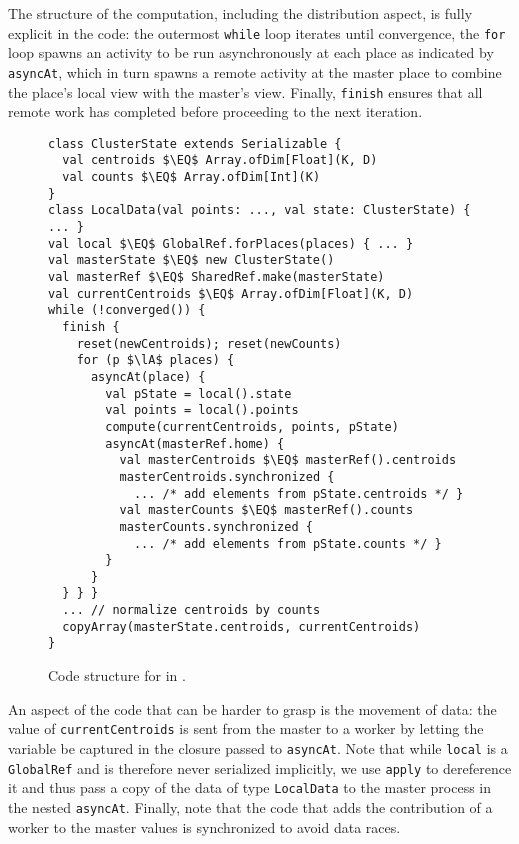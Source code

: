 The structure of the computation, including the distribution
aspect, is fully explicit in the code: the outermost \lstinline{while} loop
iterates until convergence, the \lstinline{for} loop spawns an activity to be run asynchronously at each place as indicated by \lstinline{asyncAt}, which in turn spawns a remote activity at the master place to combine the place's local view with the master's view.
Finally, \lstinline{finish} ensures that all remote work has completed before
proceeding to the next iteration.
\begin{figure}
\begin{lstlisting}
class ClusterState extends Serializable {
  val centroids $\EQ$ Array.ofDim[Float](K, D)
  val counts $\EQ$ Array.ofDim[Int](K)
}
class LocalData(val points: ..., val state: ClusterState) { ... }
val local $\EQ$ GlobalRef.forPlaces(places) { ... }
val masterState $\EQ$ new ClusterState()
val masterRef $\EQ$ SharedRef.make(masterState)
val currentCentroids $\EQ$ Array.ofDim[Float](K, D)
while (!converged()) {
  finish {
    reset(newCentroids); reset(newCounts)
    for (p $\lA$ places) {
      asyncAt(place) {
        val pState = local().state
        val points = local().points
        compute(currentCentroids, points, pState)
        asyncAt(masterRef.home) {
          val masterCentroids $\EQ$ masterRef().centroids
          masterCentroids.synchronized {
            ... /* add elements from pState.centroids */ }
          val masterCounts $\EQ$ masterRef().counts
          masterCounts.synchronized {
            ... /* add elements from pState.counts */ }
        }
      }
  } } }
  ... // normalize centroids by counts
  copyArray(masterState.centroids, currentCentroids)
}
\end{lstlisting}
\caption{Code structure for \kmeans in \apgas.\label{fig:kmeansapgas}}
\end{figure}
An aspect of the code that can be harder to grasp is the movement of data: the
value of \lstinline{currentCentroids} is sent from the master to a worker by letting the variable be captured in the closure passed to \lstinline{asyncAt}.
Note that while \lstinline{local} is a
\lstinline{GlobalRef} and is therefore never serialized implicitly, we use
\lstinline{apply} to dereference it and thus pass a copy of the data of type
\lstinline{LocalData} to the master process in the nested \lstinline{asyncAt}.
Finally, note that the code that adds the contribution of a worker to the master values is synchronized to avoid data races.

